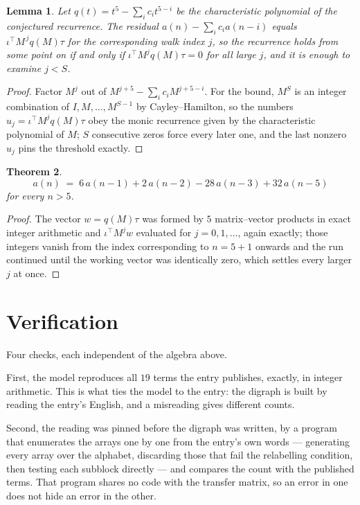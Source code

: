 \documentclass[11pt,a4paper]{article}
\theoremstyle{plain}
\newtheorem{theorem}{Theorem}
\newtheorem{lemma}[theorem]{Lemma}
\theoremstyle{definition}
\begin{document}
\begin{lemma}\label{lem:crit}
Let $q(t)=t^{5}-\sum_i c_it^{5-i}$ be the characteristic polynomial of the
conjectured recurrence. The residual $a(n)-\sum_ic_ia(n-i)$ equals
$\iota^{\!\top}M^{\,j}q(M)\tau$ for the corresponding walk index $j$, so the recurrence
holds from some point on if and only if $\iota^{\!\top}M^{j}q(M)\tau=0$ for all large $j$,
and it is enough to examine $j<S$.
\end{lemma}

\begin{proof}
Factor $M^{j}$ out of $M^{j+5}-\sum_ic_iM^{j+5-i}$. For the bound, $M^{S}$
is an integer combination of $I,M,\dots,M^{S-1}$ by Cayley--Hamilton, so the numbers
$u_j=\iota^{\!\top}M^{j}q(M)\tau$ obey the monic recurrence given by the characteristic
polynomial of $M$; $S$ consecutive zeros force every later one, and the last nonzero $u_j$
pins the threshold exactly.
\end{proof}

\begin{theorem}
\[
a(n)\;=\;6\,a(n-1) + 2\,a(n-2) - 28\,a(n-3) + 32\,a(n-5)
\]
for every $n>5$.
\end{theorem}

\begin{proof}
The vector $w=q(M)\tau$ was formed by $5$ matrix--vector products in exact integer
arithmetic and $\iota^{\!\top}M^{j}w$ evaluated for $j=0,1,\dots$, again exactly; those
integers vanish from the index corresponding to $n=5+1$ onwards and the run continued
until the working vector was identically zero, which settles every larger $j$ at once.
\end{proof}

\section{Verification}

Four checks, each independent of the algebra above.

First, the model reproduces all $19$ terms the entry publishes, exactly, in integer
arithmetic. This is what ties the model to the entry: the digraph is built by reading the
entry's English, and a misreading gives different counts.

Second, the reading was pinned before the digraph was written, by a program that enumerates
the arrays one by one from the entry's own words --- generating every array over the
alphabet, discarding those that fail the relabelling condition, then testing each subblock
directly --- and compares the count with the published terms. That program shares no code
with the transfer matrix, so an error in one does not hide an error in the other.
\end{document}
